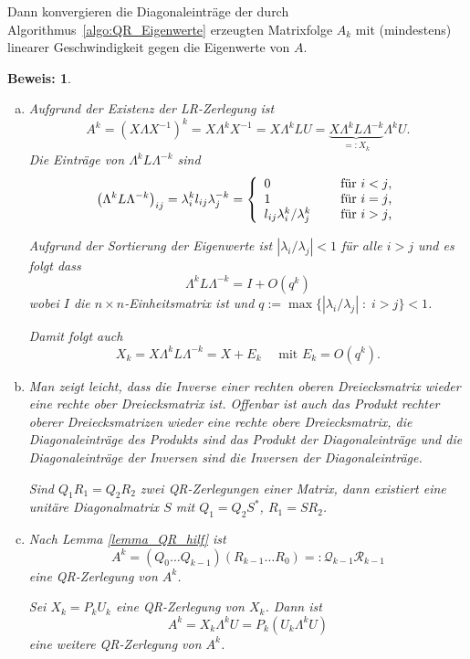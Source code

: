 \documentclass[12pt,a4paper]{book}
\theoremstyle{break}
\theoremstyle{nonumberplain}
\newtheorem{beweis}{Beweis:}
\newcommand{\1}{\mathbbm{1}} 			      	%
\newcommand{\dd}{\; : \;}    			      	%
\newcommand{\labeq}[1]{\label{eq:#1}}			%
\begin{document}
Dann konvergieren die Diagonaleinträge der durch Algorithmus~\ref{algo:QR_Eigenwerte} erzeugten 
Matrixfolge $A_k$ mit (mindestens) linearer Geschwindigkeit gegen die Eigenwerte von $A$.
\begin{beweis}

\begin{enumerate}[(a)]
%
\item Aufgrund der Existenz der LR-Zerlegung ist
\[
A^k=(X\Lambda X^{-1})^k = X \Lambda^k X^{-1}=X\Lambda^k LU = \underbrace{ X  \Lambda^k L \Lambda^{-k}}_{=:X_k} \Lambda^k  U.
\]
Die Einträge von $\Lambda^k L \Lambda^{-k}$ sind 
\[
\left( \Lambda^k L \Lambda^{-k}\right)_{ij}=\lambda_i^k l_{ij} \lambda_j^{-k}
=\left\{ \begin{array}{l l} 0 & \quad \mbox{ für $i<j$,}\\1 & \quad \mbox{ für $i=j$,}\\
l_{ij} \lambda_i^k / \lambda_j^k & \quad \mbox{ für $i>j$,}\end{array}\right.
\]

Aufgrund der Sortierung der Eigenwerte ist $|\lambda_i/\lambda_j|<1$ für alle $i>j$ und es folgt
dass 
\[
\Lambda^k L \Lambda^{-k}=I + O(q^k)
\]
wobei $I$ die $n\times n$-Einheitsmatrix ist und $q:=\max\{ |\lambda_i/\lambda_j| \dd i>j\}<1$. 

Damit folgt auch 
\begin{equation}\labeq{QRKonv_hilf1}
X_k=X\Lambda^k L \Lambda^{-k}=X+E_k \quad \mbox{ mit } E_k=O(q^k).
\end{equation}


\item Man zeigt leicht, dass die Inverse einer rechten oberen Dreiecksmatrix wieder eine rechte ober Dreiecksmatrix ist.
Offenbar ist auch das Produkt rechter oberer Dreiecksmatrizen wieder eine rechte obere Dreiecksmatrix, die Diagonaleinträge des Produkts sind das Produkt der Diagonaleinträge und die Diagonaleinträge der Inversen sind die Inversen der Diagonaleinträge. 

Sind $Q_1 R_1=Q_2 R_2$ zwei QR-Zerlegungen einer Matrix, dann existiert eine unitäre Diagonalmatrix $S$ mit
$Q_1=Q_2S^*$, $R_1=SR_2$.
%
\item Nach Lemma \ref{lemma_QR_hilf} ist
\[
A^k= (Q_0 \dots Q_{k-1})(R_{k-1} \dots R_0)=:\mathcal Q_{k-1} \mathcal R_{k-1}
\]
eine QR-Zerlegung von $A^k$.

Sei $X_k=P_k U_k$ eine QR-Zerlegung von $X_k$. Dann ist
\[
A^k=X_k \Lambda^k U= P_k (U_k \Lambda^k U)
\]
eine weitere QR-Zerlegung von $A^k$.


\end{enumerate}
\end{beweis}
\end{document}
